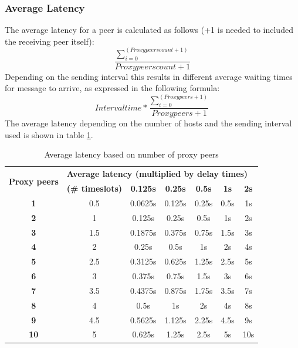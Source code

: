 \subsubsection{Average Latency}
The average latency for a peer is calculated as follows (+1 is needed to
included the receiving peer itself):
$$\frac{\sum\limits_{i=0}^{(Proxy peers count +1)}}{Proxy peers count + 1}$$
Depending on the sending interval this results in different average
waiting times for message to arrive, as expressed in
the following formula:
$$Intervaltime * \frac{\sum\limits_{i=0}^{(Proxy peers +1)}}{Proxy peers + 1}$$
The average latency depending on the number of hosts and the sending interval
used is shown in table \ref{avglatencypeers}.
\begin{longtable}{|c|c|c|c|c|c|c|}
\caption{Average latency based on number of proxy peers}
\label{avglatencypeers}\\
\hline
\multirow{2}{*}{\textbf{Proxy peers}} & \multicolumn{6}{|l|}{\textbf{Average latency (multiplied by delay times)}} \\
& \textbf{(\# timeslots)} & \textbf{0.125s} & \textbf{0.25s} & \textbf{0.5s} & \textbf{1s} & \textbf{2s}\\
\hline
\textbf{1} & 0.5 & 0.0625s & 0.125s & 0.25s & 0.5s & 1s\\
\hline
\textbf{2} & 1 & 0.125s & 0.25s & 0.5s & 1s & 2s\\
\hline
\textbf{3} & 1.5 & 0.1875s & 0.375s & 0.75s & 1.5s & 3s\\
\hline
\textbf{4} & 2 & 0.25s & 0.5s & 1s & 2s & 4s\\
\hline
\textbf{5} & 2.5 & 0.3125s & 0.625s & 1.25s & 2.5s & 5s\\
\hline
\textbf{6} & 3 & 0.375s & 0.75s & 1.5s & 3s & 6s\\
\hline
\textbf{7} & 3.5 & 0.4375s & 0.875s & 1.75s & 3.5s & 7s\\
\hline
\textbf{8} & 4 & 0.5s & 1s & 2s & 4s & 8s\\
\hline
\textbf{9} & 4.5 & 0.5625s & 1.125s & 2.25s & 4.5s & 9s\\
\hline
\textbf{10} & 5 & 0.625s & 1.25s & 2.5s & 5s & 10s\\
\hline
\end{longtable}
